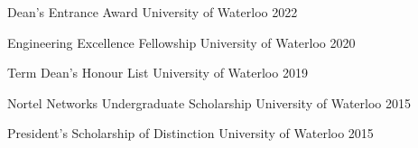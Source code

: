 
\begin{cvhonors}

  \cvhonor
    {Dean's Entrance Award} %
    {University of Waterloo} %
    {} %
    {2022} %

  \cvhonor
    {Engineering Excellence Fellowship} %
    {University of Waterloo} %
    {} %
    {2020} %

  \cvhonor
    {Term Dean's Honour List} %
    {University of Waterloo} %
    {} %
    {2019} %

  \cvhonor
    {Nortel Networks Undergraduate Scholarship} %
    {University of Waterloo} %
    {} %
    {2015} %

  \cvhonor
    {President’s Scholarship of Distinction} %
    {University of Waterloo} %
    {} %
    {2015} %
    
\end{cvhonors}
